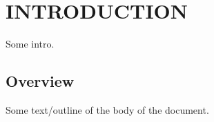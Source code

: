 \chapter{INTRODUCTION\label{chapter:introduction}}

Some intro.

\section{Overview\label{sec:overview}}

Some text/outline of the body of the document.
